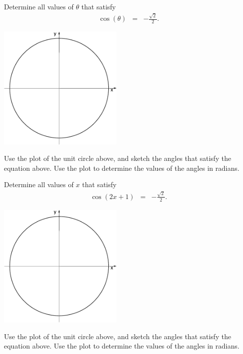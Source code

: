 \begin{problem}
\item Determine all values of $\theta$ that satisfy 
  \begin{eqnarray*}
    \cos(\theta) & = & -\frac{\sqrt{2}}{2}.
  \end{eqnarray*}

  \includegraphics[width=6cm]{trig/img/blankCircle}

  Use the plot of the unit circle above, and sketch the angles that
  satisfy the equation above. Use the plot to determine the values of
  the angles in radians.

  \vfill

  \clearpage

\item Determine all values of $x$ that satisfy 
  \begin{eqnarray*}
    \cos(2x+1) & = & -\frac{\sqrt{2}}{2}.
  \end{eqnarray*}

  \includegraphics[width=6cm]{trig/img/blankCircle}

  Use the plot of the unit circle above, and sketch the angles that
  satisfy the equation above. Use the plot to determine the values of
  the angles in radians.

  \vfill


\end{problem}
